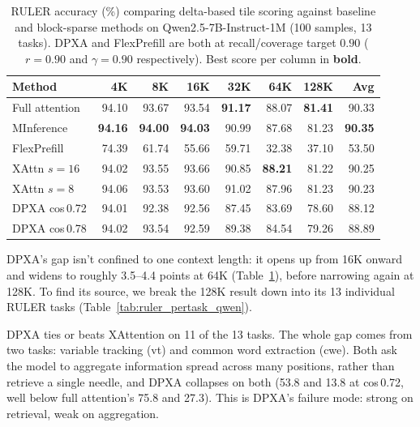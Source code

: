 \begin{table}[!ht]
\centering
\caption{RULER accuracy (\%) comparing delta-based tile scoring against baseline and block-sparse methods on Qwen2.5-7B-Instruct-1M (100 samples, 13 tasks). DPXA and FlexPrefill are both at recall/coverage target $0.90$ ($r{=}0.90$ and $\gamma{=}0.90$ respectively). Best score per column in \textbf{bold}.}
\label{tab:delta_tile_scoring_qwen}
\begin{tabular}{lrrrrrrr}
\toprule
Method & 4K & 8K & 16K & 32K & 64K & 128K & Avg \\
\midrule
Full attention              & 94.10 & 93.67 & 93.54 & \textbf{91.17} & 88.07 & \textbf{81.41} & 90.33 \\
MInference                  & \textbf{94.16} & \textbf{94.00} & \textbf{94.03} & 90.99 & 87.68 & 81.23 & \textbf{90.35} \\
FlexPrefill                  & 74.39 & 61.74 & 55.66 & 59.71 & 32.38 & 37.10 & 53.50 \\
\midrule
XAttn $s=16$                & 94.02 & 93.55 & 93.66 & 90.85 & \textbf{88.21} & 81.22 & 90.25 \\
XAttn $s=8$                 & 94.06 & 93.53 & 93.60 & 91.02 & 87.96 & 81.23 & 90.23 \\
\midrule
DPXA cos\,0.72 & 94.01 & 92.38 & 92.56 & 87.45 & 83.69 & 78.60 & 88.12 \\
DPXA cos\,0.78 & 94.02 & 93.54 & 92.59 & 89.38 & 84.54 & 79.26 & 88.89 \\
\bottomrule
\end{tabular}
\end{table}

DPXA's gap isn't confined to one context length: it opens up from 16K onward and widens to roughly 3.5--4.4 points at 64K (Table~\ref{tab:delta_tile_scoring_qwen}), before narrowing again at 128K. To find its source, we break the 128K result down into its 13 individual RULER tasks (Table~\ref{tab:ruler_pertask_qwen}).

DPXA ties or beats XAttention on 11 of the 13 tasks. The whole gap comes from two tasks: variable tracking (vt) and common word extraction (cwe). Both ask the model to aggregate information spread across many positions, rather than retrieve a single needle, and DPXA collapses on both (53.8 and 13.8 at cos\,0.72, well below full attention's 75.8 and 27.3). This is DPXA's failure mode: strong on retrieval, weak on aggregation.

